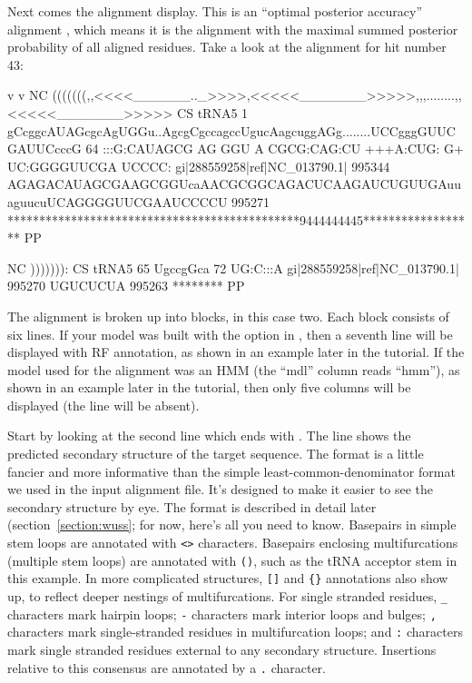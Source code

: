 Next comes the alignment display. This is an ``optimal
posterior accuracy'' alignment \cite{Holmes98}, which means it is the
alignment with the maximal summed posterior probability of all
aligned residues. Take a look at the alignment for hit number 43:

\begin{sreoutput}
                                                   v         v                                                    NC
                                       (((((((,,<<<<______.._>>>>,<<<<<_______>>>>>,,,........,,<<<<<_______>>>>> CS
                          tRNA5      1 gCcggcAUAGcgcAgUGGu..AgcgCgccagccUgucAagcuggAGg........UCCgggGUUCGAUUCcccG 64    
                                       :::G:CAUAGCG AG GGU  A CGCG:CAG:CU +++A:CUG: G+        UC:GGGGUUCGA UCCCC:
  gi|288559258|ref|NC_013790.1| 995344 AGAGACAUAGCGAAGCGGUcaAACGCGGCAGACUCAAGAUCUGUUGAuuaguucuUCAGGGGUUCGAAUCCCCU 995271
                                       **********************************************9444444445****************** PP

                                                NC
                                       ))))))): CS
                          tRNA5     65 UgccgGca 72    
                                       UG:C:::A
  gi|288559258|ref|NC_013790.1| 995270 UGUCUCUA 995263
                                       ******** PP
\end{sreoutput}

The alignment is broken up into blocks, in this case two.
Each block consists of six lines. If your model was built with the
 option in , then a seventh line will be
displayed with RF annotation, as shown in an example later in the
tutorial. If the model used for the alignment was an HMM (the ``mdl''
column reads ``hmm''), as shown in an example later in the tutorial,
then only five columns will be displayed (the  line will be
absent). 

Start by looking at the second line which ends with .  The
line shows the predicted secondary structure of the target
sequence. The format is a little fancier and more informative than the
simple least-common-denominator format we used in the input alignment
file. It's designed to make it easier to see the secondary structure
by eye. The format is described in detail later
(section~\ref{section:wuss}; for now, here's all you need to
know. Basepairs in simple stem loops are annotated with \verb+<>+
characters. Basepairs enclosing multifurcations (multiple stem loops)
are annotated with \verb+()+, such as the tRNA acceptor stem in this
example. In more complicated structures, \verb+[]+ and \verb+{}+
annotations also show up, to reflect deeper nestings of
multifurcations. For single stranded residues, \verb+_+ characters
mark hairpin loops; \verb+-+ characters mark interior loops and
bulges; \verb+,+ characters mark single-stranded residues in
multifurcation loops; and \verb+:+ characters mark single stranded
residues external to any secondary structure. Insertions relative to
this consensus are annotated by a \verb+.+ character.

